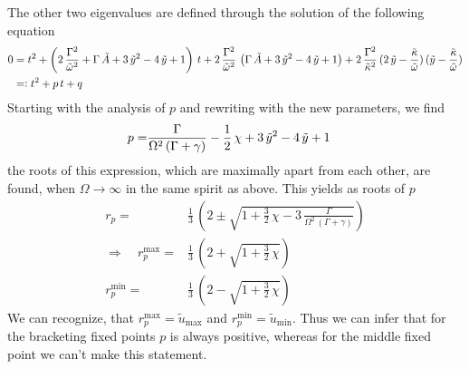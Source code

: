 \documentclass{article}
\begin{document}
The other two eigenvalues are defined through the solution of the following equation
\begin{align*}
    0&=t^2+\left( 2\,\frac{\Gamma^2}{\tilde{\omega}^2}+\Gamma\,\tilde{A}+3\,\tilde{y}^2-4\,\tilde{y}+1  \right)\,t+2\,\frac{\Gamma^2}{\tilde{\omega}^2}\,\left( \Gamma\,\tilde{A}+3\,\tilde{y}^2-4\,\tilde{y}+1 \right)+2\,\frac{\Gamma^2}{\tilde{\kappa}^2}\,(2\,\tilde{y}-\frac{\tilde{\kappa}}{\tilde{\omega}})\,(\tilde{y}-\frac{\tilde{\kappa}}{\tilde{\omega}})\\
    &=\vcentcolon t^2+p\,t+q
\end{align*}
Starting with the analysis of $p$ and rewriting with the new parameters, we find 
\begin{align*}
    p=&\frac{\Gamma}{\Omega^2\,(\Gamma+\gamma)}-\frac{1}{2}\,\chi+3\,\tilde{y}^2-4\,\tilde{y}+1
\end{align*}
the roots of this expression, which are maximally apart from each other, are found, when $\Omega\rightarrow\infty$ in the same spirit as above. This yields as roots of $p$
\begin{align*}
    r_p=&\frac{1}{3}\,\left( 2\pm\sqrt{1+\frac{3}{2}\,\chi-3\,\frac{\Gamma}{\Omega^2\,(\Gamma+\gamma)}} \right)\\
    \Rightarrow\quad r_p^\text{max}=&\frac{1}{3}\,\left( 2+\sqrt{1+\frac{3}{2}\,\chi} \right)\\
    r_p^\text{min}=&\frac{1}{3}\,\left( 2-\sqrt{1+\frac{3}{2}\,\chi} \right)
\end{align*}
We can recognize, that $r_p^\text{max}=\tilde{u}_\text{max}$ and $r_p^\text{min}=\tilde{u}_\text{min}$. Thus we can infer that for the bracketing fixed points $p$ is always positive, whereas for the middle fixed point we can't make this statement.
\end{document}
